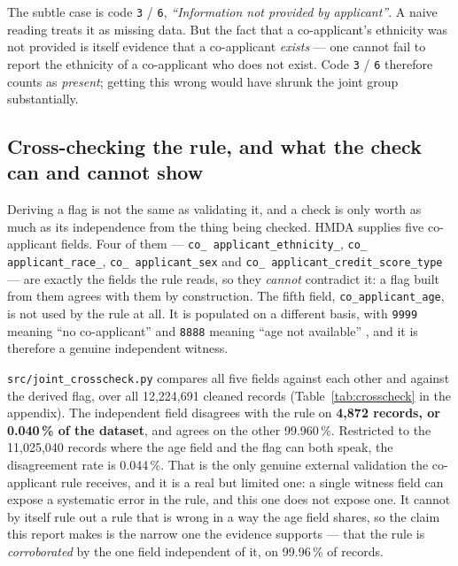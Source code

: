 \documentclass[sigconf,balance=false]{acmart}
\begin{document}
The subtle case is code \texttt{3} / \texttt{6}, \emph{``Information not
provided by applicant''}. A naive reading treats it as missing data. But the
fact that a co-applicant's ethnicity was not provided is itself evidence
that a co-applicant \emph{exists} --- one cannot fail to report the
ethnicity of a co-applicant who does not exist. Code \texttt{3} / \texttt{6}
therefore counts as \emph{present}; getting this wrong would have shrunk the
joint group substantially.

\subsection{Cross-checking the rule, and what the check can and cannot show}

Deriving a flag is not the same as validating it, and a check is only
worth as much as its independence from the thing being checked. HMDA
supplies five co-applicant fields. Four of them --- \texttt{co\_\allowbreak
applicant\_\allowbreak ethnicity\_}, \texttt{co\_\allowbreak
applicant\_\allowbreak race\_}, \texttt{co\_\allowbreak
applicant\_\allowbreak sex} and \texttt{co\_\allowbreak
applicant\_\allowbreak credit\_\allowbreak score\_\allowbreak type} --- are
exactly the fields the rule reads, so they \emph{cannot} contradict it: a
flag built from them agrees with them by construction. The fifth field,
\texttt{co\_\allowbreak applicant\_\allowbreak age}, is not used by the rule
at all. It is populated on a different basis, with \texttt{9999} meaning
``no co-applicant'' and \texttt{8888} meaning ``age not available''
\cite{hmda}, and it is therefore a genuine independent witness.

\texttt{src/joint\_\allowbreak crosscheck.py} compares all five fields
against each other and against the derived flag, over all 12{,}224{,}691
cleaned records (Table~\ref{tab:crosscheck} in the appendix). The
independent field disagrees with the rule on \textbf{4{,}872 records, or
0.040\,\% of the dataset}, and agrees on the other 99.960\,\%. Restricted
to the 11{,}025{,}040 records where the age field and the flag can both
speak, the disagreement rate is 0.044\,\%. That is the only genuine
external validation the co-applicant rule receives, and it is a real but
limited one: a single witness field can expose a systematic error in the
rule, and this one does not expose one. It cannot by itself rule out a
rule that is wrong in a way the age field shares, so the claim this report
makes is the narrow one the evidence supports --- that the rule is
\emph{corroborated} by the one field independent of it, on 99.96\,\% of
records.
\end{document}
